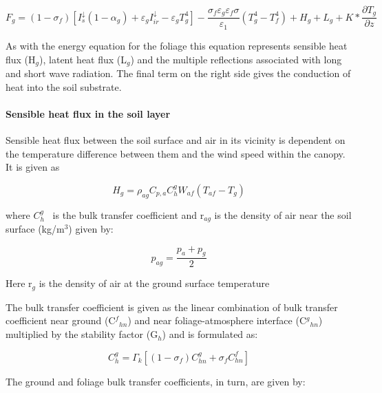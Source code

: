 \begin{equation}
{F_g} = (1 - {\sigma_f})\left[ {I_s^ \downarrow (1 - {\alpha_g}) + {\varepsilon_g}I_{ir}^ \downarrow  - {\varepsilon_g}T_g^4} \right] - \frac{{{\sigma_f}{\varepsilon_g}{\varepsilon_f}\sigma }}{{{\varepsilon_1}}}\left( {T_g^4 - T_f^4} \right) + {H_g} + {L_g} + K*\frac{{\partial {T_g}}}{{\partial z}}
\end{equation}

As with the energy equation for the foliage this equation represents sensible heat flux (H\(_{g}\)), latent heat flux (L\(_{g}\)) and the multiple reflections associated with long and short wave radiation. The final term on the right side gives the conduction of heat into the soil substrate.

\paragraph{Sensible heat flux in the soil layer}\label{sensible-heat-flux-in-the-soil-layer}

Sensible heat flux between the soil surface and air in its vicinity is dependent on the temperature difference between them and the wind speed within the canopy. It is given as

\begin{equation}
{H_g} = {\rho_{ag}}{C_{p,a}}C_h^g{W_{af}}({T_{af}} - {T_g})
\end{equation}

where \(C_h^g\) ~is the bulk transfer coefficient and r\(_{ag}\) is the density of air near the soil surface (kg/m\(^{3}\)) given by:

\begin{equation}
{p_{ag}} = \frac{{{p_a} + {p_g}}}{2}
\end{equation}

Here r\(_{g}\) is the density of air at the ground surface temperature

The bulk transfer coefficient is given as the linear combination of bulk transfer coefficient near ground (C\(^{f}\)\(_{hn}\)) and near foliage-atmosphere interface (C\(^{g}\)\(_{hn}\)) multiplied by the stability factor (G\(_{h}\)) and is formulated as:

\begin{equation}
C_h^g = {\Gamma_k}\left[ {\left( {1 - {\sigma_f}} \right)C_{hn}^g + {\sigma_f}C_{hn}^f} \right]
\end{equation}

The ground and foliage bulk transfer coefficients, in turn, are given by:

